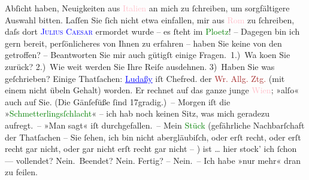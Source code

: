                Abſicht haben, Neuigkeiten aus \textcolor{pink}{Italien}{}\ledrightnote{\textcolor{pink}{Italien}} an mich zu
               ſchreiben, um sorgfältigere Auswahl bitten. Laſſen Sie ſich nicht etwa einfallen, mir
               aus \textcolor{pink}{Rom}{}\ledrightnote{\textcolor{pink}{Rom}} zu ſchreiben, daſs dort \textcolor{blue}{\textsc{Julius Caesar}}{}\ledrightnote{\textcolor{blue}{Gaius Iulius Caesar}} ermordet wurde – es ſteht im \textcolor{blue}{\textcolor{green}{Ploetz}{}}{}\ledrightnote{\textcolor{blue}{Karl Ploetz}}! – Dagegen bin ich gern {\pb}bereit, perſönlicheres
               von Ihnen zu erfahren – haben Sie keine von den \label{K_L00376_1v}\label{K_L00376_1h} getroffen? –
               Beantworten Sie mir auch gütigſt einige Fragen. 1.) Wa{\geminationn}
                  ko{\geminationm}en Sie zurück? 2.) Wie weit werden Sie Ihre Reiſe
               ausdehnen. 3) Haben Sie was geſchrieben?\pend
           \pstart
           Einige Thatſachen: \textcolor{blue}{\uline{Ludaßy}}{}\ledrightnote{\textcolor{blue}{Julius von Gans-Ludassy}} iſt Chefred. der \textcolor{brown}{Wr. Allg. Ztg.}{}\ledrightnote{\textcolor{brown}{Wiener Allgemeine Zeitung}} (mit einem
               nicht übeln Gehalt) worden. Er rechnet auf das ganze junge \textcolor{pink}{Wien}{}\ledrightnote{\textcolor{pink}{Wien}}; »alſo« auch auf Sie. (Die Gänſefüße ſind 17gradig.) –\pend
           \pstart
           Morgen iſt die »\textcolor{green}{Schmetterlingsſchlacht}{}\ledrightnote{\textcolor{green}{Die Schmetterlingsschlacht}}« – ich hab
                  {\pb}noch keinen Sitz, was mich geradezu aufregt. –\pend
           \pstart
           »Man sagt« iſt durchgefallen. –\pend
           \pstart
           Mein \textcolor{green}{Stück}{} (gefährliche
               Nachbarſchaft der Thatſachen – Sie ſehen, ich bin nicht abergläubiſch, oder erſt
               recht, oder erſt recht gar nicht, oder gar nicht erſt recht gar nicht – ) ist {\dots} hier stock’ ich ſchon — vollendet? {\dotstwo} Nein. Beendet? Nein. Fertig? – Nein. – Ich habe »nur mehr« dran zu feilen.
